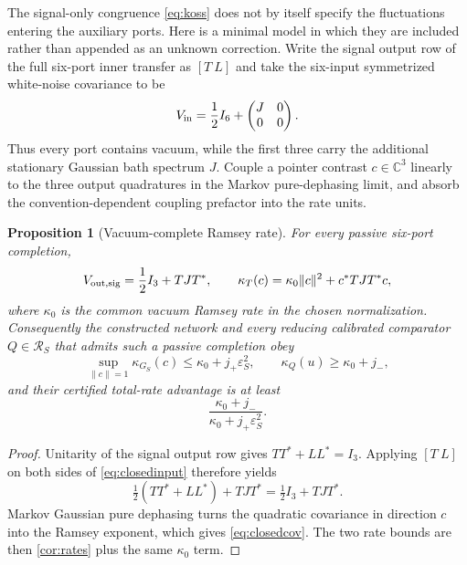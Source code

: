 \documentclass[11pt]{article}
\newtheorem{proposition}[theorem]{Proposition}
\theoremstyle{definition}
\theoremstyle{remark}
\newcommand{\C}{\mathbb{C}}
\newcommand{\cR}{\mathcal{R}}
\begin{document}
The signal-only congruence \eqref{eq:koss} does not by itself specify the
fluctuations entering the auxiliary ports.  Here is a minimal model in which
they are included rather than appended as an unknown correction.  Write the
signal output row of the full six-port inner transfer as $[T\ L]$ and take the
six-input symmetrized white-noise covariance to be
\begin{equation}\label{eq:closedinput}
 V_{\rm in}=\frac12 I_6+\begin{pmatrix}J&0\\0&0\end{pmatrix}.
\end{equation}
Thus every port contains vacuum, while the first three carry the additional
stationary Gaussian bath spectrum $J$.  Couple a pointer contrast $c\in\C^3$
linearly to the three output quadratures in the Markov pure-dephasing limit,
and absorb the convention-dependent coupling prefactor into the rate units.

\begin{proposition}[Vacuum-complete Ramsey rate]\label{prop:vacuumclosed}
For every passive six-port completion,
\begin{equation}\label{eq:closedcov}
 V_{{\rm out},{\rm sig}}=\frac12 I_3+TJT^*,
 \qquad
 \kappa_T(c)=\kappa_0\|c\|^2+c^*TJT^*c,
\end{equation}
where $\kappa_0$ is the common vacuum Ramsey rate in the chosen normalization.
Consequently the constructed network and every reducing calibrated comparator
$Q\in\cR_S$ that admits such a passive completion obey
\begin{equation}\label{eq:totalrates}
 \sup_{\|c\|=1}\kappa_{G_S}(c)
 \leq\kappa_0+j_+\varepsilon_S^2,
 \qquad
 \kappa_Q(u)\geq\kappa_0+j_-,
\end{equation}
and their certified total-rate advantage is at least
\begin{equation}\label{eq:vacuumratio}
 \frac{\kappa_0+j_-}{\kappa_0+j_+\varepsilon_S^2}.
\end{equation}
\end{proposition}

\begin{proof}
Unitarity of the signal output row gives $TT^*+LL^*=I_3$.  Applying
$[T\ L]$ on both sides of \eqref{eq:closedinput} therefore yields
\[
 \tfrac12(TT^*+LL^*)+TJT^*=\tfrac12I_3+TJT^*.
\]
Markov Gaussian pure dephasing turns the quadratic covariance in direction
$c$ into the Ramsey exponent, which gives \eqref{eq:closedcov}.  The two rate
bounds are then \cref{cor:rates} plus the same $\kappa_0$ term.
\end{proof}
\end{document}
